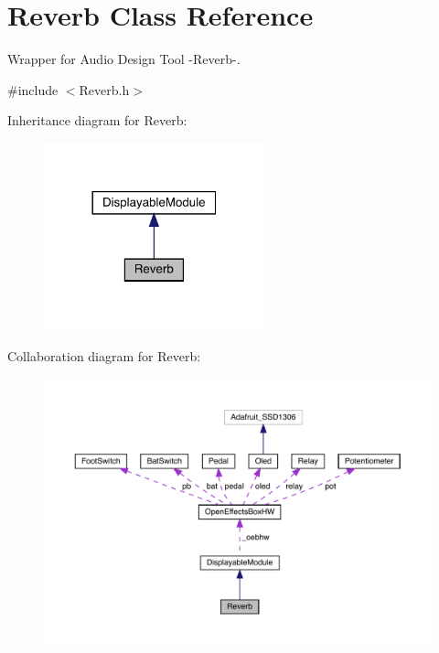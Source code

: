\hypertarget{class_reverb}{}\section{Reverb Class Reference}
\label{class_reverb}


Wrapper for Audio Design Tool -\/\+Reverb-\/.  




{\ttfamily \#include $<$Reverb.\+h$>$}



Inheritance diagram for Reverb\+:
\nopagebreak
\begin{figure}[H]
\begin{center}
\leavevmode
\includegraphics[width=180pt]{class_reverb__inherit__graph}
\end{center}
\end{figure}


Collaboration diagram for Reverb\+:
\nopagebreak
\begin{figure}[H]
\begin{center}
\leavevmode
\includegraphics[width=350pt]{class_reverb__coll__graph}
\end{center}
\end{figure}
